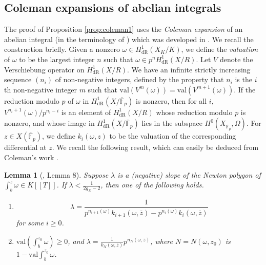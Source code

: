 \documentclass[11pt]{amsart}
\newcommand{\dR}{\mathrm{dR}}
\newcommand{\val}{\mathrm{val}}
\theoremstyle{plain}
\newtheorem{lemma}{Lemma}
\theoremstyle{definition}
\newcommand{\F}{\mathbb{F}}
\begin{document}
\subsection{Coleman expansions of abelian integrals}
The proof of Proposition \ref{prop:coleman1} uses the \textit{Coleman expansion} of an abelian integral (in the terminology of \cite{DP25}) which was developed in \cite{coleman:ramified}. We recall the construction briefly. Given a nonzero $\omega \in H^1 _{\dR} (X_K /K)$, we define the \textit{valuation} of $\omega $ to be the largest integer $n$ such that $\omega \in p^n H^1 _{\dR}(X/R)$. Let $V$ denote the Verschiebung operator on $H^1 _{\dR}(X/R)$. We have an infinite strictly increasing sequence $(n_i )$ of non-negative integers, defined by the property that $n_i$ is the $i$th non-negative integer $m$ such that $\val (V^m (\omega ))=\val (V^{m+1}(\omega ))$. If the reduction modulo $p$ of $\omega $ in $H^1 _{\dR}(X/\overline{\F }_p )$ is nonzero, then for all $i$, $V^{n_i+1}(\omega )/p^{n_i-i}$ is an element of $H^1 _{\dR}(X/R)$ whose reduction modulo $p$ is nonzero, and whose image in $H^1 _{\dR}(X/\overline{\F }_p )$ lies in the subspace $H^0 (X_{\overline{\F }_p },\Omega )$. For $z\in X(\overline{\F} _p )$, we define $k_i (\omega ,z)$ to be the valuation of the corresponding differential at $z$. We recall the following result, which can easily be deduced from Coleman's work \cite{coleman:ramified}. 
\begin{lemma}[\cite{DP25}, Lemma 8]\label{lemma:DP}
Suppose $\lambda $ is a (negative) slope of the Newton polygon of $\int ^z _b \omega \in K[\! [T]\! ]$. If $\lambda < \frac{1}{2g_X-2}$, then one of the following holds.
\begin{enumerate}
\item 
\begin{equation}\label{eqn:slopes}
\lambda =\frac{1}{p^{n_{i+1} (\omega )}k_{i+1}(\omega ,\overline{z})-p^{n_i (\omega )}k_{i}(\omega ,\overline{z})}
\end{equation}
for some $i\geq 0$.
\item $\val (\int _b ^{z_0 }\omega )\geq 0$, and $\lambda =\frac{1}{k_N (\omega ,\overline{z} )} p^{n_N (\omega ,\overline{z})}$, where $N=N(\omega ,z_0 )$ is $1-\val \int _b ^{z_0 }\omega $.
\end{enumerate}
\end{lemma}
\end{document}

